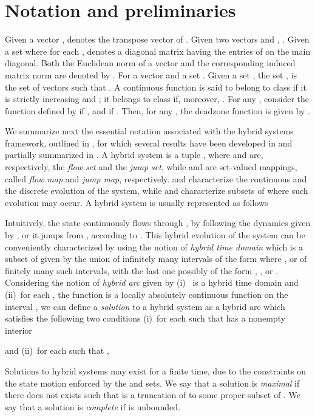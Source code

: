 \documentclass[twocolumn]{autart}
\begin{document}
\section{Notation and preliminaries}
\label{sec:preliminaries}
Given a vector ,  denotes the transpose vector 
of . Given two vectors  and , . 
Given a set  where  for each
,  denotes 
a diagonal matrix having the entries of  
on the main diagonal. Both the Euclidean norm of a vector 
and the corresponding induced matrix norm
are denoted by . 
For a vector  and a set  
.
{ 
Given a set , the set 
, 
is the set of vectors
 such that . }
A {continuous} function
 is said 
to belong to class  if it is strictly increasing and ;
it belongs to class  if, moreover, .
For any , consider the function 
 defined by 
 if , and 
 if . Then,
for any ,
the deadzone function  is 
given by .



We summarize next the essential notation associated with the hybrid 
systems framework, outlined in \cite{Goebel04}, 
for which several results have been developed in
\cite{Goebel06,SanfeliceTAC07,Sanfelice08} and partially 
summarized in \cite{GoebelCSM09}. 
A hybrid system  
is a tuple , where  and  
are, respectively, the \emph{flow set} and the \emph{jump set}, 
while  and  are set-valued
mappings, called \emph{flow map} and 
\emph{jump map}, respectively.
 and  characterize the continuous and the discrete 
evolution of the system, while  and  
characterize subsets of  
where such evolution may occur. A hybrid system is usually
represented as follows

Intuitively, the state continuously flows through , 
by following the dynamics given by , or it jumps from , 
according to . This hybrid evolution of
the system can be conveniently characterized by using the
notion of \emph{hybrid time domain} which is a subset
 of  given by
the union of infinitely many intervals of the form
 where , 
or of finitely many such intervals, with the last one possibly of the form
, , or
. Considering the notion of 
\emph{hybrid arc}  
given by
(i)~ is a hybrid time domain and 
(ii)~for each , the function  is a locally absolutely 
continuous function on the interval ,
we can define a \emph{solution} to a hybrid system  
as a hybrid arc which satisfies the following two conditions
(i)~for each  such that  has a nonempty interior

and (ii)~for each  such that ,
 
Solutions to hybrid systems may exist for a finite time,
due to the constraints on the state motion enforced by the  and 
sets. We say that a solution  is \emph{maximal} if there does not exists 
such that  is a truncation of  to some proper subset of
. We say that a solution  is 
\emph{complete} if  is unbounded.
\end{document}
